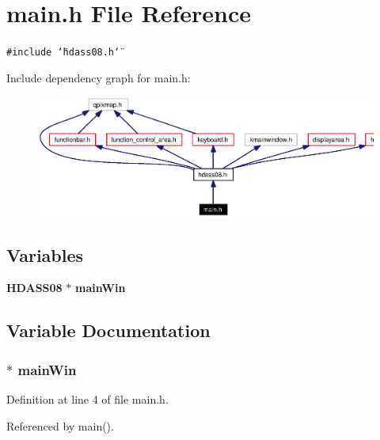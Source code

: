 \section{main.h File Reference}
\label{main_8h}


{\tt \#include \char`\"{}hdass08.h\char`\"{}}\par


Include dependency graph for main.h:\begin{figure}[H]
\begin{center}
\leavevmode
\includegraphics[width=332pt]{main_8h__incl}
\end{center}
\end{figure}
\subsection*{Variables}
\begin{CompactItemize}
\item 
{\bf HDASS08} $\ast$ {\bf main\-Win}
\end{CompactItemize}


\subsection{Variable Documentation}
\subsubsection{$\ast$ {\bf main\-Win}}\label{main_8h_a0}




Definition at line 4 of file main.h.

Referenced by main().